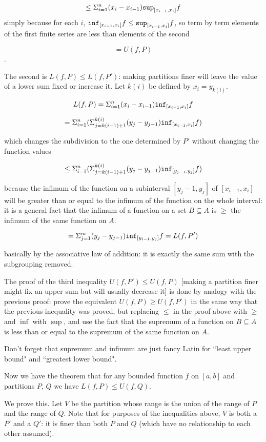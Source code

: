 \documentclass[12pt]{article}
\begin{document}
$$\leq \Sigma_{i=1}^n (x_i-x_{i-1}){\tt sup}_{[x_{i-1},x_i]}f$$ simply because for each $i$, ${\tt inf}_{[x_{i-1},x_i]}f\leq {\tt sup}_{[x_{i-1},x_i]}f$, so term by term
elements of the first finite series are less than elements of the second

$$= U(f,P)$$.

The second is $L(f,P) \leq L(f,P')$:  making partitions finer will leave the value of a lower sum fixed or increase it.
Let $k(i)$ be defined by $x_i = y_{k(i)}$.

$$L(f,P) = \Sigma_{i=1}^n (x_i-x_{i-1}){\tt inf}_{[x_{i-1},x_i]}f$$

$$= \Sigma_{i=1}^n (\Sigma_{j=k(i-1)+1}^{k(i)} (y_j-y_{j-1}){\tt inf}_{[x_{i-1},x_i]}f)$$

which changes the subdivision to the one determined by $P'$ without changing the function values

$$\leq \Sigma_{i=1}^n (\Sigma_{j=k(i-1)+1}^{k(i)} (y_j-y_{j-1}){\tt inf}_{[y_{j-1},y_j]}f)$$

because the infimum of the function on a subinterval $[y_j-1,y_j]$ of $[x_{i-1},x_i]$ will be greater than or equal to the infimum of the function on the whole interval:  it is a general fact
that the infimum of a function on a set $B \subseteq A$ is $\geq$ the infimum  of the same function on $A$.

$$= \Sigma_{j=1}^m (y_j-y_{j-1}){\tt inf}_{[y_{i-1},y_j]}f= L(f,P')$$

basically by the associative law of addition:  it is exactly the same sum with the subgrouping removed.

The proof of the third inequality $U(f,P') \leq U(f,P)$ [making a partition finer might fix an upper sum but will usually decrease it] is done by analogy with the previous proof: prove the equivalent $U(f,P) \geq U(f,P')$ in the same way that the previous inequality was proved, but replacing $\leq$ in the proof above with $\geq$ and $\inf$ with $\sup$, and use the
fact that the supremum of a function on $B \subseteq A$ is less than or equal to the supremum of the same function on $A$.

Don't forget that supremum and infimum are just fancy Latin for ``least upper bound" and ``greatest lower bound".

Now we have the theorem that for any bounded function $f$ on $[a,b]$ and partitions $P$, $Q$ we have $L(f,P) \leq U(f,Q)$.

We prove this.  Let $V$ be the partition whose range is the union of the range of $P$ and the range of $Q$.  Note that for purposes of the inequalities above, $V$ is both a $P'$ and a $Q'$:  it is finer than both $P$ and $Q$ (which have no relationship to each other assumed).
\end{document}
